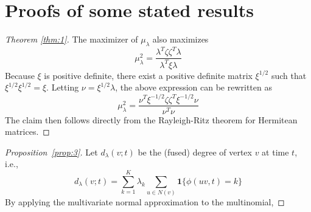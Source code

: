 \documentclass[draftcls]{IEEEtran}
\theoremstyle{definition}
\begin{document}
\section{Proofs of some stated results}
\begin{proof}[Theorem \ref{thm:1}]
  The maximizer of $\mu_\lambda$ also maximizes
  \begin{equation*}
    \mu_{\lambda}^{2} = \frac{\lambda^{T} \zeta \zeta^{T}
      \lambda}{\lambda^{T} \xi \lambda}
  \end{equation*}
  Because $\xi$ is positive definite, there exist a positive definite matrix
  $\xi^{1/2}$ such that $\xi^{1/2} \xi^{1/2} = \xi$. Letting $\nu = \xi^{1/2}
  \lambda$, the above expression can be rewritten as
  \begin{equation*}
    \mu_{\lambda}^{2} = \frac{\nu^{T} \xi^{-1/2} \zeta \zeta^{T}
      \xi^{-1/2} \nu}{ \nu^{T} \nu}
  \end{equation*}
  The claim then follows directly from the Rayleigh-Ritz theorem for
  Hermitean matrices.
\end{proof}
\begin{proof}[Proposition~\ref{prop:3}]
  Let $d_{\lambda}(v;t)$ be the (fused) degree of vertex $v$ at time
  $t$, i.e.,
  \begin{equation*}
    d_{\lambda}(v;t) = \sum_{k = 1}^{K} \lambda_k \sum_{u \in N(v)}
    \mathbf{1}\{ \phi(uv,t) = k \}
  \end{equation*}
  By applying the multivariate normal approximation to the
  multinomial, 
\end{proof}


\end{document}
